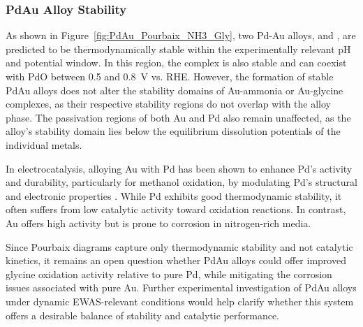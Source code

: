 \documentclass[journal=jacsat,manuscript=article]{achemso}
\begin{document}
\subsubsection{PdAu Alloy Stability}

As shown in Figure~\ref{fig:PdAu_Pourbaix_NH3_Gly}, two Pd-Au alloys,  and , are predicted to be thermodynamically stable within the experimentally relevant pH and potential window. In this region, the \ce{[Au(NH3)_2]^+} complex is also stable and can coexist with PdO between 0.5 and 0.8~V vs. RHE. However, the formation of stable PdAu alloys does not alter the stability domains of Au-ammonia or Au-glycine complexes, as their respective stability regions do not overlap with the alloy phase. The passivation regions of both Au and Pd also remain unaffected, as the alloy's stability domain lies below the equilibrium dissolution potentials of the individual metals.

In electrocatalysis, alloying Au with Pd has been shown to enhance Pd’s activity and durability, particularly for methanol oxidation, by modulating Pd’s structural and electronic properties \cite{Hoshi2006StructuralPalladium, Kelly2018UnderstandingReaction, Aota2023RevealingTomography}. While Pd exhibits good thermodynamic stability, it often suffers from low catalytic activity toward oxidation reactions. In contrast, Au offers high activity but is prone to corrosion in nitrogen-rich media.

Since Pourbaix diagrams capture only thermodynamic stability and not catalytic kinetics, it remains an open question whether PdAu alloys could offer improved glycine oxidation activity relative to pure Pd, while mitigating the corrosion issues associated with pure Au. Further experimental investigation of PdAu alloys under dynamic EWAS-relevant conditions would help clarify whether this system offers a desirable balance of stability and catalytic performance.
\end{document}

